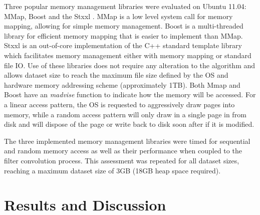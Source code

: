 Three popular memory management libraries were evaluated on Ubuntu 11.04: MMap, Boost \citep{Gaz2012} and the Stxxl \citep{Dementiev2005}. MMap is a low level system call for memory mapping, allowing for simple memory management. Boost is a multi-threaded library for efficient memory mapping that is easier to implement than MMap. Stxxl is an out-of-core implementation of the C++ standard template library which facilitates memory management either with memory mapping or standard file IO. Use of these libraries does not require any alteration to the algorithm  and allows dataset size to reach the maximum file size defined by the OS and hardware memory addressing scheme (approximately 1TB). Both Mmap and Boost have an \emph{madvise}  function to indicate how the memory will be accessed. For a linear access pattern, the OS is requested to aggressively draw pages into memory, while  a random access pattern will only draw in a single page in from disk and will dispose of the page or write back to disk soon after if it is modified.

The three implemented memory management libraries were timed for sequential and random memory access as well as their performance when coupled to the filter convolution process.  This assessment  was repeated for all dataset sizes, reaching a maximum dataset size of 3GB (18GB heap space required). 


\section{Results and Discussion}
  
